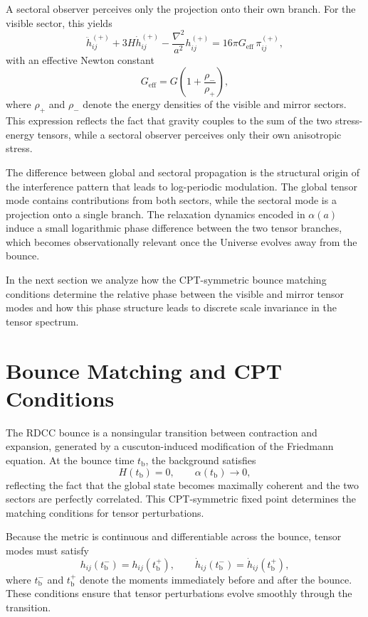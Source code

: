 \documentclass[11pt,a4paper]{article}
\begin{document}
A sectoral observer perceives only the projection onto their own branch. For the visible
sector, this yields
\begin{equation}
    \ddot{h}^{(+)}_{ij}
    + 3H \dot{h}^{(+)}_{ij}
    - \frac{\nabla^{2}}{a^{2}} h^{(+)}_{ij}
    = 16\pi G_{\mathrm{eff}}\, \pi^{(+)}_{ij},
\end{equation}
with an effective Newton constant
\begin{equation}
    G_{\mathrm{eff}}
    = G \left( 1 + \frac{\rho_{-}}{\rho_{+}} \right),
\end{equation}
where $\rho_{+}$ and $\rho_{-}$ denote the energy densities of the visible and mirror
sectors. This expression reflects the fact that gravity couples to the sum of the two
stress-energy tensors, while a sectoral observer perceives only their own anisotropic
stress.

The difference between global and sectoral propagation is the structural origin of the
interference pattern that leads to log-periodic modulation. The global tensor mode
contains contributions from both sectors, while the sectoral mode is a projection onto a
single branch. The relaxation dynamics encoded in $\alpha(a)$ induce a small logarithmic
phase difference between the two tensor branches, which becomes observationally
relevant once the Universe evolves away from the bounce.

In the next section we analyze how the CPT-symmetric bounce matching conditions
determine the relative phase between the visible and mirror tensor modes and how this
phase structure leads to discrete scale invariance in the tensor spectrum.

\section{Bounce Matching and CPT Conditions}

The RDCC bounce is a nonsingular transition between contraction and expansion,
generated by a cuscuton-induced modification of the Friedmann equation. At the
bounce time $t_{\mathrm{b}}$, the background satisfies
\begin{equation}
    H(t_{\mathrm{b}}) = 0,
    \qquad
    \alpha(t_{\mathrm{b}}) \rightarrow 0,
\end{equation}
reflecting the fact that the global state becomes maximally coherent and the two
sectors are perfectly correlated. This CPT-symmetric fixed point determines the
matching conditions for tensor perturbations.

Because the metric is continuous and differentiable across the bounce, tensor modes
must satisfy
\begin{equation}
    h_{ij}(t_{\mathrm{b}}^{-}) = h_{ij}(t_{\mathrm{b}}^{+}),
    \qquad
    \dot{h}_{ij}(t_{\mathrm{b}}^{-}) = \dot{h}_{ij}(t_{\mathrm{b}}^{+}),
\end{equation}
where $t_{\mathrm{b}}^{-}$ and $t_{\mathrm{b}}^{+}$ denote the moments immediately before and after
the bounce. These conditions ensure that tensor perturbations evolve smoothly through
the transition.
\end{document}
